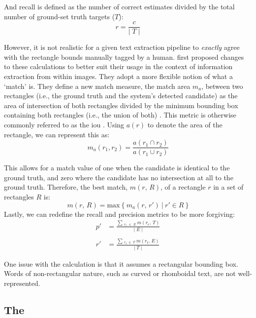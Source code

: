 And recall is defined as the number of correct estimates divided by the total number of ground-set truth targets ($T$):
\begin{equation*}
  r = \frac{c}{\lvert\;T\;\rvert}
\end{equation*}

However, it is not realistic for a given text extraction pipeline to \textit{exactly} agree with the rectangle bounds manually tagged by a human. \citet{Lucas:2003iw} first proposed changes to these calculations to better suit their usage in the context of information extraction from within images. They adopt a more flexible notion of what a `match' is. They define a new match measure, the match area $m_{a}$, between two rectangles (i.e., the ground truth and the system's detected candidate) as the area of intersection of both rectangles divided by the minimum bounding box containing both rectangles (i.e., the union of both) \citep{Lucas:2003iw, Lucas:2005bq, Lucas:2005hl}. This metric is otherwise commonly referred to as the \gls{iou} \citep{Karatzas:2015tj,Lin:2014vma,Jaderberg:2016wj}. Using $a(r)$ to denote the area of the rectangle, we can represent this as:
\begin{equation*}
  m_{a}(r_{1}, r_{2}) = \frac{a(r_{1} \cap r_{2})}{a(r_{1} \cup r_{2})}
\end{equation*}

This allows for a match value of one when the candidate is identical to the ground truth, and zero where the candidate has no intersection at all to the ground truth. Therefore, the best match, $m(r,\,R)$, of a rectangle $r$ in a set of rectangles $R$ is:
\begin{equation*}
  m(r,\,R) = \mathrm{max}~\{~m_{a}(r,\,r')~|~r' \in R~\}
\end{equation*}
\noindent
Lastly, we can redefine the recall and precision metrics to be more forgiving:
\begin{align*}
  p' &= \frac{\sum\,_{r_{e}\;\in\;E}~m(r_{e},\,T)}{\lvert\;E\;\rvert}\\\\
  r' &= \frac{\sum\,_{r_{t}\;\in\;T}~m(r_{t},\,E)}{\lvert\;T\;\rvert}
\end{align*}

One issue with the calculation is that it assumes a rectangular bounding box. Words of non-rectangular nature, such as curved or rhomboidal text, are not well-represented.

\subsection{The \fscore}
\label{sec:background:metrics:fscore}

